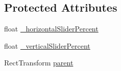 \subsection*{Protected Attributes}
\begin{DoxyCompactItemize}
\item 
float \mbox{\hyperlink{class_leap_1_1_unity_1_1_interaction_1_1_interaction_slider_a5e5fa6567015733a70839c85521dab61}{\+\_\+horizontal\+Slider\+Percent}}
\item 
float \mbox{\hyperlink{class_leap_1_1_unity_1_1_interaction_1_1_interaction_slider_af9e4615728cba8989b60d8aecf6436e5}{\+\_\+vertical\+Slider\+Percent}}
\item 
Rect\+Transform \mbox{\hyperlink{class_leap_1_1_unity_1_1_interaction_1_1_interaction_slider_a8db525944d09fcb639d3808153307691}{parent}}
\end{DoxyCompactItemize}
